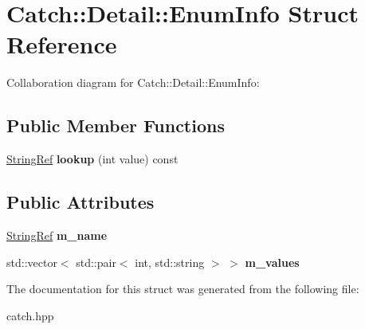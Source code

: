 \hypertarget{structCatch_1_1Detail_1_1EnumInfo}{}\section{Catch\+:\+:Detail\+:\+:Enum\+Info Struct Reference}
\label{structCatch_1_1Detail_1_1EnumInfo}


Collaboration diagram for Catch\+:\+:Detail\+:\+:Enum\+Info\+:
\subsection*{Public Member Functions}
\begin{DoxyCompactItemize}
\item 
\mbox{\label{structCatch_1_1Detail_1_1EnumInfo_a2fdfacc411d7afb1cb690366e5e49cb3}} 
\hyperlink{classCatch_1_1StringRef}{String\+Ref} {\bfseries lookup} (int value) const
\end{DoxyCompactItemize}
\subsection*{Public Attributes}
\begin{DoxyCompactItemize}
\item 
\mbox{\label{structCatch_1_1Detail_1_1EnumInfo_a16ecfd3a7e11439433aabbdf6ecb676c}} 
\hyperlink{classCatch_1_1StringRef}{String\+Ref} {\bfseries m\+\_\+name}
\item 
\mbox{\label{structCatch_1_1Detail_1_1EnumInfo_a1093082858366071bae0eba1fb3c3388}} 
std\+::vector$<$ std\+::pair$<$ int, std\+::string $>$ $>$ {\bfseries m\+\_\+values}
\end{DoxyCompactItemize}


The documentation for this struct was generated from the following file\+:\begin{DoxyCompactItemize}
\item 
catch.\+hpp\end{DoxyCompactItemize}
